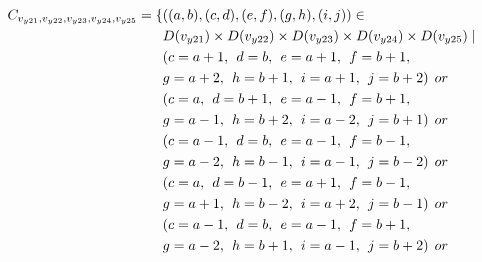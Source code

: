 \begin{align*}
\Cons{y21}{y22}{y23}{y24}{y25}=\{&((a,b),(c,d),(e,f),(g,h),(i,j))\in \\
&\Domain {y21} \times \Domain{y22}\times \Domain{y23}\times \Domain{y24}\times \Domain{y25} \mid\\
&(c = a + 1,\hspace{1ex}d = b,\hspace{1ex}e=a+1,\hspace{1ex}f=b+1,
\\&g=a+2,\hspace{1ex}h=b+1,\hspace{1ex}i=a+1,\hspace{1ex}j=b+2)\hspace{1ex} or \\
&(c = a ,\hspace{1ex}d = b+1,\hspace{1ex}e=a-1,\hspace{1ex}f=b+1,
\\&g=a-1,\hspace{1ex}h=b+2,\hspace{1ex}i=a-2,\hspace{1ex}j=b+1)\hspace{1ex} or \\
&(c = a-1 ,\hspace{1ex}d = b,\hspace{1ex}e=a-1,\hspace{1ex}f=b-1,
\\&g=a-2,\hspace{1ex}h=b-1,\hspace{1ex}i=a-1,\hspace{1ex}j=b-2)\hspace{1ex} or \\
&(c = a ,\hspace{1ex}d = b-1,\hspace{1ex}e=a+1,\hspace{1ex}f=b-1,
\\&g=a+1,\hspace{1ex}h=b-2,\hspace{1ex}i=a+2,\hspace{1ex}j=b-1)\hspace{1ex} or \\
&(c = a-1 ,\hspace{1ex}d = b,\hspace{1ex}e=a-1,\hspace{1ex}f=b+1,
\\&g=a-2,\hspace{1ex}h=b+1,\hspace{1ex}i=a-1,\hspace{1ex}j=b+2)\hspace{1ex} or \\

\end{align*}
